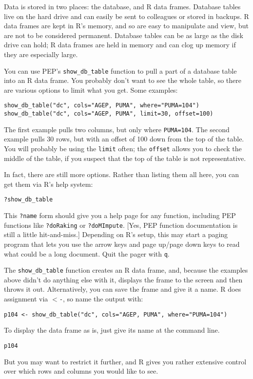 \documentclass{article}
\begin{document}
Data is stored in two places: the database, and R data frames. Database tables
live on the hard drive and can easily be sent to colleagues or stored in
backups. R data frames are kept in R's memory, and so are easy to manipulate and
view, but are not to be considered permanent. Database tables can be as large as 
the disk drive can hold; R data frames are held in memory and can clog up memory if
they are especially large.

You can use PEP's {\tt show\_db\_table} function to pull a part of a database table into
an R data frame. You probably don't want to see the whole table, so there are
various options to limit what you get. Some examples:
\begin{rcode} 
\begin{verbatim}
show_db_table("dc", cols="AGEP, PUMA", where="PUMA=104")
show_db_table("dc", cols="AGEP, PUMA", limit=30, offset=100)
\end{verbatim}
\end{rcode} 
The first example pulls two columns, but only where {\tt PUMA=104}. The second
example pulls 30 rows, but with an offset of 100 down from the top of the
table. You will probably be using the {\tt limit} often; the {\tt offset} allows
you to check the middle of the table, if you suspect that the top of the table
is not representative.

In fact, there are still more options. Rather than listing them all here, you can get them
via R's help system:
\begin{rcode} 
\begin{verbatim}
?show_db_table
\end{verbatim}
\end{rcode} 
This {\tt ?name} form should give you a help page for any function, including PEP
functions like {\tt ?doRaking} or {\tt ?doMImpute}. [Yes, PEP function documentation is still a
little hit-and-miss.] Depending on R's
setup, this may start a paging program that lets you use the arrow keys and page
up/page down keys to read what could be a long document. Quit the pager with {\tt q}.

The {\tt show\_db\_table} function creates an R data frame, and, because the examples above didn't do
anything else with it, displays the frame to the screen and then throws it out. Alternatively, you can
save the frame and give it a name. R does assignment via {\tt $<$-}, so name the output
with:
\begin{rcode} 
\begin{verbatim}
p104 <- show_db_table("dc", cols="AGEP, PUMA", where="PUMA=104")
\end{verbatim}
\end{rcode} 
To display the data frame as is, just give its name at the command line.
\begin{rcode} 
\begin{verbatim}
p104
\end{verbatim}
\end{rcode} 
But you may want to restrict it further, and R gives you rather extensive control over
which rows and columns you would like to see.
\end{document}
